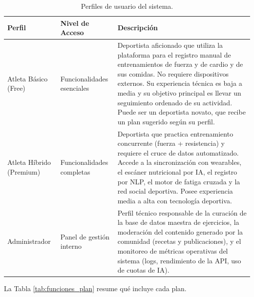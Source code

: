 \begin{table}[h!]
    \centering
    \renewcommand{\arraystretch}{1.3}
    \begin{tabular}{|p{3cm}|p{4cm}|p{7.5cm}|}
        \hline
        \rowcolor[HTML]{EFEFEF}
        \textbf{Perfil} & \textbf{Nivel de Acceso} & \textbf{Descripción} \\ \hline
        Atleta Básico (Free) & Funcionalidades esenciales & Deportista aficionado que utiliza la plataforma para el registro manual de entrenamientos de fuerza y de cardio y de sus comidas. No requiere dispositivos externos. Su experiencia técnica es baja a media y su objetivo principal es llevar un seguimiento ordenado de su actividad. Puede ser un deportista novato, que recibe un plan sugerido según su perfil. \\ \hline
        Atleta Híbrido (Premium) & Funcionalidades completas & Deportista que practica entrenamiento concurrente (fuerza + resistencia) y requiere el cruce de datos automatizado. Accede a la sincronización con wearables, el escáner nutricional por IA, el registro por NLP, el motor de fatiga cruzada y la red social deportiva. Posee experiencia media a alta con tecnología deportiva. \\ \hline
        Administrador & Panel de gestión interno & Perfil técnico responsable de la curación de la base de datos maestra de ejercicios, la moderación del contenido generado por la comunidad (recetas y publicaciones), y el monitoreo de métricas operativas del sistema (logs, rendimiento de la API, uso de cuotas de IA). \\ \hline
    \end{tabular}
    \caption{Perfiles de usuario del sistema.}
    \label{tab:perfiles_usuario}
\end{table}
\newpage
La Tabla \ref{tab:funciones_plan} resume qué incluye cada plan.

